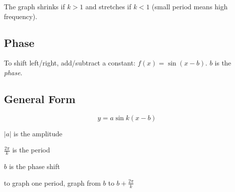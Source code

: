 \documentclass{exam}
\begin{document}
  The graph shrinks if $k > 1$ and stretches if $k < 1$ (small period means high frequency).

  \subsection{Phase}
  To shift left/right, add/subtract a constant: $f(x) = \sin(x - b)$.  $b$ is the {\em phase}.

  \subsection{General Form}
  \[
    y = a \sin k(x - b)
  \]

  \begin{itemize*}
    \item $|a|$ is the amplitude
    \item $\frac{2 \pi}{k}$ is the period
    \item $b$ is the phase shift

    \item to graph one period, graph from $b$ to $b + \frac{2 \pi}{k}$
  \end{itemize*}
\end{document}
